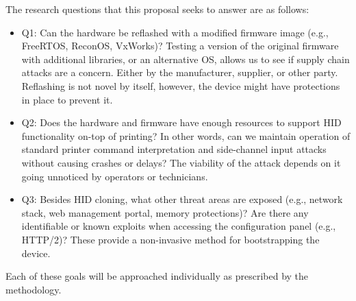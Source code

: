 The research questions that this proposal seeks to answer are as follows:
\begin{itemize}
  \item Q1: Can the hardware be reflashed with a modified firmware image (e.g., FreeRTOS, ReconOS, VxWorks)? Testing a version of the original firmware with additional libraries, or an alternative OS, allows us to see if supply chain attacks are a concern. Either by the manufacturer, supplier, or other party. Reflashing is not novel by itself, however, the device might have protections in place to prevent it.  
  \item Q2: Does the hardware and firmware have enough resources to support HID functionality on-top of printing? In other words, can we maintain operation of standard printer command interpretation and side-channel input attacks without causing crashes or delays? The viability of the attack depends on it going unnoticed by operators or technicians. 
  \item Q3: Besides HID cloning, what other threat areas are exposed (e.g., network stack, web management portal, memory protections)? Are there any identifiable or known exploits when accessing the configuration panel (e.g., HTTP/2)? These provide a non-invasive method for bootstrapping the device.
\end{itemize}

Each of these goals will be approached individually as prescribed by the methodology.